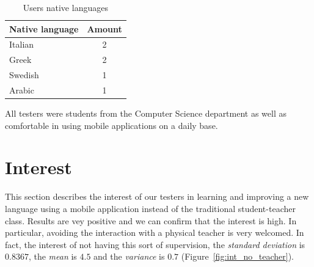 \begin{table}[!ht]
    \centering
    \begin{tabular}{|l|c|}
        \hline
        \multicolumn{1}{|c|}{\textbf{Native language}} & \textbf{Amount} \\ \hline
        Italian                                        & 2               \\ \hline
        Greek                                          & 2               \\ \hline
        Swedish                                        & 1               \\ \hline
        Arabic                                         & 1               \\ \hline
    \end{tabular}
    \caption{Users native languages}
    \label{table:native_languages}
\end{table}

\noindent All testers were students from the Computer Science department as well as comfortable in using mobile applications on a daily base.

\section{Interest}
\label{sub:Interest}

This section describes the interest of our testers in learning and improving a new language using a mobile application instead of the traditional student-teacher class. Results are vey positive and we can confirm that the interest is high. In particular, avoiding the interaction with a physical teacher is very welcomed. In fact, the interest of not having this sort of supervision, the \textit{standard deviation} is $0.8367$, the \textit{mean} is $4.5$ and the \textit{variance} is $0.7$ (Figure~\ref{fig:int_no_teacher}).

